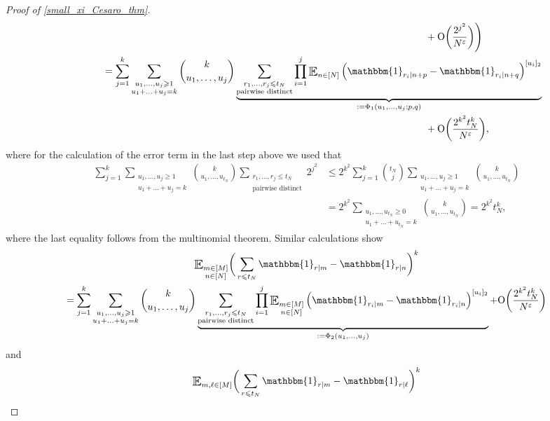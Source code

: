 \documentclass[letter,11pt]{article}
\theoremstyle{plain} %
\theoremstyle{definition} %
\theoremstyle{plain}
\theoremstyle{plain}
\theoremstyle{plain}
\numberwithin{equation}{section}
\newcommand{\Oh}{{\mathrm O}}
\renewcommand{\epsilon}{\varepsilon}
\renewcommand{\leq}{\leqslant}
\renewcommand{\geq}{\geqslant}
\newcommand{\Esub}[1]{\raisebox{-0.4ex}{\scalebox{1.4}[1.3]{$\mathbb{E}$}}\raisebox{-0.35ex}{\ensuremath{_{\scriptstyle #1}}}}
\newcommand{\1}{\mathbbm{1}}
\begin{document}
\begin{proof}[Proof of \cref{small_xi_Cesaro_thm}]
\begin{align*}
& \hspace*{12.7cm} + \Oh\bigg(\frac{2^{j^2}}{N^\epsilon}\bigg)\Bigg)
\\
&\hspace*{1.1cm}
= \sum_{j=1}^k \sum_{\substack{u_1,\ldots,u_{j}\geq 1 \\ u_1+\ldots+u_j=k}} \binom{k}{u_1,\ldots,u_j}\underbrace{\sum_{\substack{r_1,\ldots,r_j\leq t_N \\ \text{pairwise distinct}}}\prod_{i=1}^{j} \Esub{n\in[N]}  
\left(\1_{r_i\mid n+p}-\1_{r_i\mid n+q}\right)^{[u_i]_2}}_{:=\Phi_1(u_1,\ldots,u_j;p,q)} \\
& \hspace*{12.7cm} + \Oh\bigg(\frac{2^{k^2}t_N^k}{N^\epsilon}\bigg),
\end{align*}
where for the calculation of the error term in the last step above we used that
\begin{align*}
    \sum_{j=1}^k \sum_{\substack{u_1,\ldots,u_j\geq 1 \\ u_1+\ldots+u_j=k}} \binom{k}{u_1,\ldots,u_{t_N}} \sum_{\substack{r_1,\ldots,r_j\leq t_N \\ \text{pairwise distinct}}} 2^{j^2}
    & \leq 2^{k^2} \sum_{j=1}^k \binom{t_N}{j} \sum_{\substack{u_1,\ldots,u_j\geq 1 \\ u_1+\ldots+u_j=k}} \binom{k}{u_1,\ldots,u_{t_N}} \\
    & = 2^{k^2}\sum_{\substack{u_1,\ldots,u_{t_N}\geq 0 \\ u_1+\dots +u_{t_N}=k}}\binom{k}{u_1,\ldots,u_{t_N}}
    = 2^{k^2}t_N^k,
\end{align*}
where the last equality follows from the multinomial theorem.
Similar calculations show 
\begin{multline*}
\Esub{\substack{m\in[M] \\ n\in[N]}}\bigg(\sum_{r\leq t_N}\1_{r\mid m}-\1_{r\mid n}\bigg)^k
\\
=
\sum_{j=1}^k\sum_{\substack{u_1,\ldots,u_j\geq 1 \\ u_1+\ldots+u_j=k}} \binom{k}{u_1,\ldots,u_j} \underbrace{\sum_{\substack{r_1,\ldots,r_j\leq t_N \\ \text{pairwise distinct}}}\prod_{i=1}^j\Esub{\substack{m\in[M] \\ n\in[N]}} 
\left(\1_{r_i\mid m}-\1_{r_i\mid n}\right)^{[u_i]_2}}_{:=\Phi_2(u_1,\ldots,u_j)} + \Oh\bigg(\frac{2^{k^2}t_N^k}{N^\epsilon}\bigg)
\end{multline*}
and
\begin{multline*}
\Esub{m,\ell\in[M]}\bigg(\sum_{r\leq t_N}\1_{r\mid m}-\1_{r\mid \ell}\bigg)^k

\end{multline*}
\end{proof}
\end{document}
